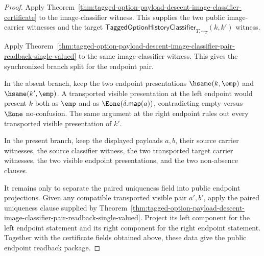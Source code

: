 \begin{proof}
Apply
Theorem~\ref{thm:tagged-option-payload-descent-image-classifier-certificate}
to the image-classifier witness. This supplies the two public image-carrier
witnesses and the target
$\mathsf{TaggedOptionHistoryClassifier}_{T,\sim_T}(k,k')$ witness.

Apply
Theorem~\ref{thm:tagged-option-payload-descent-image-classifier-pair-readback-single-valued}
to the same image-classifier witness. This gives the synchronized branch split
for the endpoint pair.

In the absent branch, keep the two endpoint presentations
$\hsame(k,\emp)$ and $\hsame(k',\emp)$. A transported visible presentation at
the left endpoint would present $k$ both as $\emp$ and as
$\Eone(\delta.\mathsf{map}(a))$, contradicting empty-versus-$\Eone$
no-confusion. The same argument at the right endpoint rules out every
transported visible presentation of $k'$.

In the present branch, keep the displayed payloads $a,b$, their source carrier
witnesses, the source classifier witness, the two transported target carrier
witnesses, the two visible endpoint presentations, and the two non-absence
clauses.

It remains only to separate the paired uniqueness field into public endpoint
projections. Given any compatible transported visible pair $a',b'$, apply the
paired uniqueness clause supplied by
Theorem~\ref{thm:tagged-option-payload-descent-image-classifier-pair-readback-single-valued}.
Project its left component for the left endpoint statement and its right
component for the right endpoint statement. Together with the certificate
fields obtained above, these data give the public endpoint readback package.
\end{proof}

